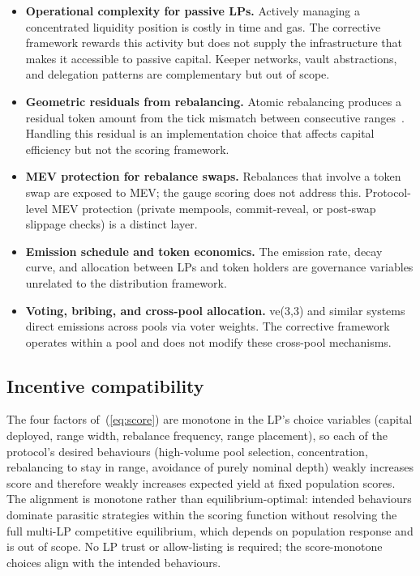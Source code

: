 \documentclass[11pt,a4paper]{article}
\theoremstyle{cgdefinition}
\theoremstyle{cgplain}
\theoremstyle{cgremark}
\begin{document}
\begin{itemize}[leftmargin=2em]
\item \textbf{Operational complexity for passive LPs.} Actively managing a concentrated liquidity position is costly in time and gas. The corrective framework rewards this activity but does not supply the infrastructure that makes it accessible to passive capital. Keeper networks, vault abstractions, and delegation patterns are complementary but out of scope.
\item \textbf{Geometric residuals from rebalancing.} Atomic rebalancing produces a residual token amount from the tick mismatch between consecutive ranges~\cite{ryan2026a}. Handling this residual is an implementation choice that affects capital efficiency but not the scoring framework.
\item \textbf{MEV protection for rebalance swaps.} Rebalances that involve a token swap are exposed to MEV; the gauge scoring does not address this. Protocol-level MEV protection (private mempools, commit-reveal, or post-swap slippage checks) is a distinct layer.
\item \textbf{Emission schedule and token economics.} The emission rate, decay curve, and allocation between LPs and token holders are governance variables unrelated to the distribution framework.
\item \textbf{Voting, bribing, and cross-pool allocation.} ve(3,3) and similar systems direct emissions across pools via voter weights. The corrective framework operates within a pool and does not modify these cross-pool mechanisms.
\end{itemize}

\subsection{Incentive compatibility}\label{sec:incentive}

The four factors of~(\ref{eq:score}) are monotone in the LP's choice variables (capital deployed, range width, rebalance frequency, range placement), so each of the protocol's desired behaviours (high-volume pool selection, concentration, rebalancing to stay in range, avoidance of purely nominal depth) weakly increases score and therefore weakly increases expected yield at fixed population scores. The alignment is monotone rather than equilibrium-optimal: intended behaviours dominate parasitic strategies within the scoring function without resolving the full multi-LP competitive equilibrium, which depends on population response and is out of scope. No LP trust or allow-listing is required; the score-monotone choices align with the intended behaviours.
\end{document}
